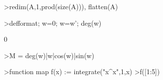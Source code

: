\documentclass[a4paper,11pt,oneside,enabledeprecatedfontcommands]{scrbook}
\newenvironment{eulernotebook}{}{}
\begin{document}
\begin{eulernotebook}
\begin{eulerprompt}
>redim(A,1,prod(size(A))), flatten(A)
\end{eulerprompt}
\begin{euleroutput}
[1,  2,  3,  4,  5,  6,  7,  8,  9]
[1,  2,  3,  4,  5,  6,  7,  8,  9]
\end{euleroutput}
\begin{eulerprompt}
>defformat; w=0; w=w'; deg(w)
\end{eulerprompt}
\begin{euleroutput}
0
\end{euleroutput}
\begin{eulerprompt}
>M = deg(w)|w|cos(w)|sin(w)
\end{eulerprompt}
\begin{euleroutput}
[0,  0,  1,  0]
\end{euleroutput}
\begin{eulerprompt}
>function map f(x) := integrate("x^x",1,x)
>f([1:5])
\end{eulerprompt}
\begin{euleroutput}
[0,  2.05045,  13.7251,  113.336,  1241.03]
\end{euleroutput}


\end{eulernotebook}
\end{document}
